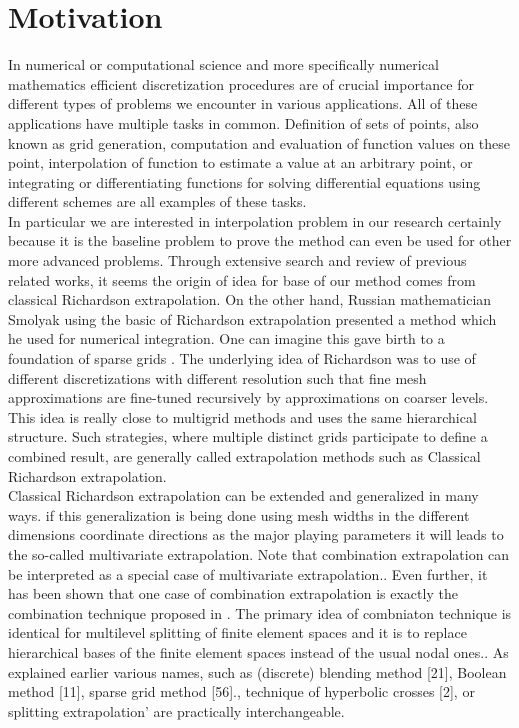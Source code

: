 \section{Motivation}
In numerical or computational science and more specifically numerical mathematics efficient discretization procedures are of crucial importance for different types of problems we encounter in various applications. All of these applications have multiple tasks in common. Definition of sets of points, also known as grid generation, computation and evaluation of function values on these point, interpolation of function to estimate a value at an arbitrary point, or integrating or differentiating functions for solving differential equations using different schemes are all examples of these tasks.\\
In particular we are interested in interpolation problem in our research certainly because it is the baseline problem to prove the method can even be used for other more advanced problems. Through extensive search and review of previous related works, it seems the origin of idea for base of our method comes from classical Richardson extrapolation\cite{Rude1994}. On the other hand, Russian mathematician Smolyak using the basic of Richardson extrapolation presented a method which he used for numerical integration. One can imagine this gave birth to a foundation of sparse grids \cite{smolyak63quadrature}.
The underlying idea of Richardson was to use of different discretizations with different resolution such that fine mesh approximations are fine-tuned recursively by approximations on coarser levels. This idea is really close to multigrid methods and uses the same hierarchical structure.  Such strategies, where multiple distinct grids participate to define a combined  result, are generally called extrapolation methods such as Classical Richardson extrapolation.\\
Classical Richardson extrapolation can be extended and generalized in many ways. if this generalization is being done using  mesh widths in the different dimensions coordinate directions as the major playing parameters it will leads to the so-called multivariate extrapolation\cite{Rude1994}. Note that combination extrapolation can be interpreted as a special case of multivariate extrapolation.\cite{Griebel1992, Rude92extrapolationand}. Even further, it has been shown that one case of combination extrapolation is exactly the combination technique proposed in \cite{Griebel1992b}. The primary idea of combniaton technique is identical for multilevel splitting of finite element spaces and it is to replace hierarchical bases of the finite element spaces instead of the usual nodal ones.\cite{Yserentant1986}. As explained earlier various names, such as (discrete) blending method [21], Boolean method [11], sparse grid method [56].\cite{Gerstner1998}, technique of hyperbolic crosses [2]\cite{Griebel1998}, or splitting extrapolation' \cite{Zumbusch2000} are practically interchangeable.  %
